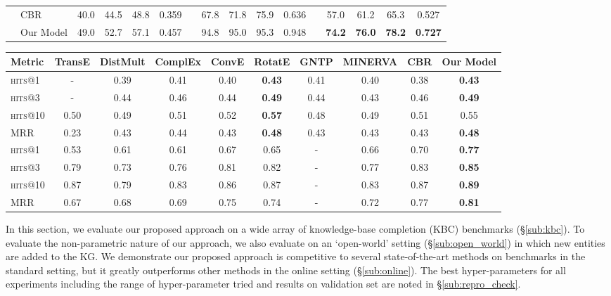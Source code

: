 \documentclass[11pt,a4paper]{article}
\newcommand{\cbr}{\textsc{CBR}\xspace}
\newcommand{\fb}{FB122\xspace}
\newcommand{\nell}{NELL-995\xspace}
\newcommand{\wn}{WN18RR\xspace}
\begin{document}
\begin{table*}
{\begin{tabular}{clcccccccccccccc}
& CBR~\citep{cbr} & 40.0 & 44.5 & 48.8 & 0.359 & & 67.8 & 71.8 & 75.9 & 0.636 & & 57.0 & 61.2 & 65.3 & 0.527 \\
& Our Model & 49.0 & 52.7 & 57.1 & 0.457 & & 94.8 & 95.0 & 95.3 & 0.948 & & \textbf{74.2} & \textbf{76.0} & \textbf{78.2} & \textbf{0.727} \\
\bottomrule
\end{tabular}
}
\caption{Link prediction results on \fb. Test-II denotes a subset of triples that can be inferred via logical rules.} \label{tab:fb122}
\end{table*}

\begin{table*}
\centering
\small
\begin{tabular}{@{} l  c c c c c c c c c @{}}\toprule
 \textbf{Metric} & \textbf{TransE} & \textbf{DistMult} & \textbf{ComplEx}  & \textbf{ConvE} & \textbf{RotatE} & \textbf{GNTP} & \textbf{MINERVA} & \textbf{\cbr} & \textbf{Our Model}\\\midrule
\textsc{hits}@1  & - & 0.39 & 0.41 & 0.40 & \textbf{0.43} & 0.41 & 0.40 &     0.38 & \textbf{0.43}\\
 \textsc{hits}@3  & - & 0.44 & 0.46 & 0.44 & \textbf{0.49} & 0.44 & 0.43 & 0.46 & \textbf{0.49}\\
 \textsc{hits}@10 & 0.50 & 0.49 & 0.51 & 0.52 & \textbf{0.57} & 0.48 & 0.49 & 0.51 & 0.55\\
 \textsc{MRR}     & 0.23 & 0.43 & 0.44 & 0.43  & \textbf{0.48} & 0.43 & 0.43 & 0.43 & \textbf{0.48}\\
\midrule
\textsc{hits}@1 & 0.53 & 0.61 & 0.61 & 0.67 & 0.65 & - & 0.66 & 0.70&  \textbf{0.77} \\
\textsc{hits}@3 & 0.79 & 0.73 & 0.76 & 0.81 & 0.82 & - & 0.77 & 0.83 & \textbf{0.85}\\
\textsc{hits}@10 & 0.87 & 0.79 & 0.83 & 0.86 & 0.87 & - & 0.83 & 0.87 & \textbf{0.89}\\
\textsc{MRR} & 0.67 & 0.68 & 0.69 & 0.75 & 0.74 & - & 0.72  & 0.77 & \textbf{0.81}\\
\bottomrule
\end{tabular}
\caption{Results on \wn (above) and \nell (tail-prediction;below)}
\label{tab:wn_nell}
\vspace{-2mm}
\end{table*}

In this section, we evaluate our proposed approach on a wide array of 
knowledge-base completion (KBC) benchmarks (\S \ref{sub:kbc}). To evaluate the non-parametric nature of our approach, we also evaluate on an `open-world' setting (\S\ref{sub:open_world}) in which new entities are added to the KG. We demonstrate our proposed approach is competitive to several 
state-of-the-art methods on benchmarks in the standard setting, but it greatly outperforms
other methods in the online setting (\S\ref{sub:online}). The best hyper-parameters for all experiments including the range of hyper-parameter tried and results on validation set are noted in \S\ref{sub:repro_check}.
\end{document}
